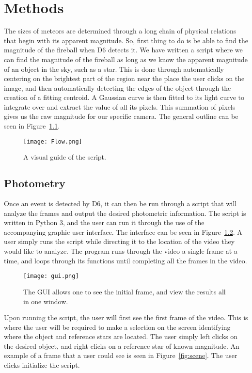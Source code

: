 \chapter{Methods}

The sizes of meteors are determined through a long chain of physical relations that begin with its apparent magnitude. So, first thing to do is be able to find the magnitude of the fireball when D6 detects it. We have written a script where we can find the magnitude of the fireball as long as we know the apparent magnitude of an object in the sky, such as a star. This is done through automatically centering on the brightest part of the region near the place the user clicks on the image, and then automatically detecting the edges of the  object through the creation of a fitting centroid. A Gaussian curve is then fitted to its light curve to integrate over and extract the value of all its pixels. This summation of pixels gives us the raw magnitude for our specific camera. The general outline can be seen in Figure~\ref{fig:flowchart}.

\begin{figure}[htpb]
	\centering
	\texttt{[image: Flow.png]}
	\caption{A visual guide of the script.}
	\label{fig:flowchart}
\end{figure}

\section{Photometry}

Once an event is detected by D6, it can then be run through a script that will analyze the frames and output the desired photometric information. The script is written in Python 3, and the user can run it through the use of the accompanying graphic user interface. The interface can be seen in Figure~\ref{fig:gui}. A user simply runs the script while directing it to the location of the video they would like to analyze. The program runs through the video a single frame at a time, and loops through its functions until completing all the frames in the video.

\begin{figure}[htpb]
	\centering
	\texttt{[image: gui.png]}
	\caption{The GUI allows one to see the initial frame, and view the results all in one window.}
	\label{fig:gui}
\end{figure}
Upon running the script, the user will first see the first frame of the video. This is where the user will be required to make a selection on the screen identifying where the object and reference stars are located. The user simply left clicks on the desired object, and right clicks on a reference star of known magnitude. An example of a frame that a user could see is seen in Figure~\ref{fig:scene}. The user clicks initialize the script. 

